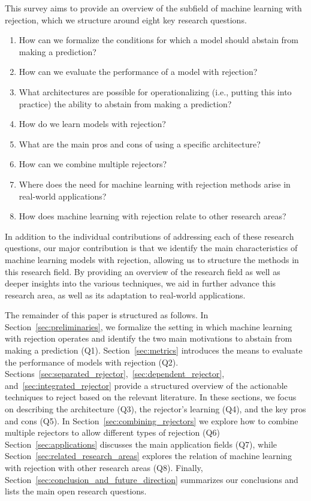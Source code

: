 This survey aims to provide an overview of the subfield of machine learning with rejection, which we structure around eight key research questions.
\begin{enumerate}
    \item[Q1.] How can we formalize the conditions for which a model should abstain from making a prediction?
    \item[Q2.] How can we evaluate the performance of a model with rejection?
    \item[Q3.] What architectures are possible for operationalizing (i.e., putting this into practice) the ability to abstain from making a prediction?
    \item[Q4.] How do we learn models with rejection?
    \item[Q5.] What are the main pros and cons of using a specific architecture?
    \item[Q6.] How can we combine multiple rejectors?
    \item[Q7.] Where does the need for machine learning with rejection methods arise in real-world applications?
    \item[Q8.] How does machine learning with rejection relate to other research areas?
\end{enumerate}
In addition to the individual contributions of addressing each of these research questions, our major contribution is that we identify the main characteristics of machine learning models with rejection, allowing us to structure the methods in this research field.
By providing an overview of the research field as well as deeper insights into the various techniques, we aid in further advance this research area, as well as its adaptation to real-world applications. 

The remainder of this paper is structured as follows. In Section~\ref{sec:preliminaries}, we formalize the setting in which machine learning with rejection operates and identify the two main motivations to abstain from making a prediction (Q1). Section~\ref{sec:metrics} introduces the means to evaluate the performance of models with rejection (Q2).
Sections~\ref{sec:separated_rejector},~\ref{sec:dependent_rejector}, and~\ref{sec:integrated_rejector} provide a structured overview of the actionable techniques to reject based on the relevant literature. In these sections, we focus on describing the architecture (Q3), the rejector's learning (Q4), and the key pros and cons (Q5). In Section~\ref{sec:combining_rejectors} we explore how to combine multiple rejectors to allow different types of rejection (Q6)
Section~\ref{sec:applications} discusses the main application fields (Q7), while Section~\ref{sec:related_research_areas} explores the relation of machine learning with rejection with other research areas (Q8). 
Finally, Section~\ref{sec:conclusion_and_future_direction} summarizes our conclusions and lists the main open research questions.

